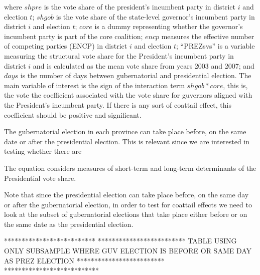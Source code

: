 \documentclass[a4paper,12pt]{article}
\begin{document}
{where $shpre$ is the vote share of the president's incumbent party in district $i$ and election $t$; $shgob$ is the vote share of the state-level governor's incumbent party in district $i$ and election $t$; $core$ is a dummy representing whether the governor's incumbent party is part of the core coalition; $encp$ measures the effective number of competing parties (ENCP) in district $i$ and election $t$; ``PREZsvs'' is a variable measuring the structural vote share for the President's incumbent party in district $i$ and is calculated as the mean vote share from years 2003 and 2007;  and $days$ is the number of days between gubernatorial and presidential election. The main variable of interest is the sign of the interaction term $shgob*core$, this is, the vote the coefficient associated with the vote share for guvernors aligned with the President's incumbent party. If there is any sort of coattail effect, this coefficient should be positive and significant.


The gubernatorial election in each province can take place before, on
the same date or after the presidential election. This is relevant
since we are interested in testing whether there are

The equation considers measures of short-term and long-term
determinants of the Presidential vote share.

Note that since the presidential election can take place before, on
the same day or after the gubernatorial election,  in order to test for coattail effects we need to look at the subset of gubernatorial elections that take place either before or on the same date as the presidential election.

**************************
*************************
TABLE USING ONLY SUBSAMPLE WHERE GUV ELECTION IS BEFORE OR SAME DAY AS PREZ ELECTION
*************************
***************************

}
\end{document}
